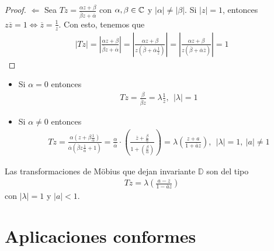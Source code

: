 \begin{proof}
    $\Longleftarrow$ Sea $Tz = \frac{\alpha z + \beta}{\overline{\beta}z + \overline{\alpha}}$ con $\alpha,\beta \in \mathbb{C}$ y $|\alpha| \not = |\beta|$. Si $|z| = 1$, entonces $z\overline{z} = 1 \Longleftrightarrow \overline{z} = \frac{1}{z}$. Con esto, tenemos que
    \begin{align*}
        |Tz| = \left| \frac{\alpha z + \beta}{\overline{\beta} z + \overline{\alpha}} \right| = \left| \frac{\alpha z + \beta}{z\left(\overline{\beta} + \overline{\alpha}\frac{1}{\overline{z}}\right)} \right| = \left| \frac{\alpha z + \beta}{z\left(\overline{\beta} + \overline{\alpha}\overline{z}\right)} \right| = 1
    \end{align*}
\end{proof}

\begin{obs}
    \begin{itemize}
        \item Si $\alpha = 0$ entonces
              \begin{align*}
                  Tz = \frac{\beta}{ \overline{\beta}z} = \lambda \frac{1}{z}, \ \ |\lambda| = 1
              \end{align*}
        \item Si $\alpha \not = 0$ entonces
              \begin{align*}
                  Tz = \frac{\alpha\left(z +\beta \frac{1}{\alpha}\right)}{ \overline{\alpha}\left(\overline{\beta}z \frac{1}{\overline{\alpha}} + 1\right)} = \frac{\alpha}{\overline{\alpha}} \cdot \left( \frac{\overline{z} + \frac{\beta}{\alpha}}{1 + \overline{\left(\frac{\beta}{\alpha}\right)}} \right) = \lambda\left( \frac{z + a}{1 + \overline{a}z}\right) , \ \ |\lambda| = 1, \ |a| \not =  1
              \end{align*}
    \end{itemize}
\end{obs}

\begin{teo}
    Las transformaciones de M\"obius que dejan invariante $\mathbb{D}$ son del tipo
    \begin{align*}
        Tz = \lambda\left( \frac{a-z}{1 - \overline{a}z}\right)
    \end{align*}
    con $|\lambda| = 1$ y $|a| < 1$.
\end{teo}

\section{Aplicaciones conformes}


